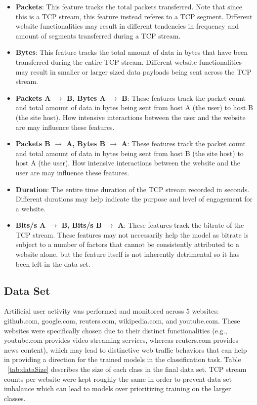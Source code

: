 \documentclass[10pt,sigconf,letterpaper,nonacm]{acmart}
\begin{document}
\begin{itemize}
  \item \textbf{Packets}: This feature tracks the total packets transferred. Note that since this is a TCP stream, this feature instead referes to a TCP segment. Different website functionalities may result in different tendencies in frequency and amount of segments transferred during a TCP stream.
  
  \item \textbf{Bytes}: This feature tracks the total amount of data in bytes that have been transferred during the entire TCP stream. Different website functionalities may result in smaller or larger sized data payloads being sent across the TCP stream.
  
  \item \textbf{Packets A $\rightarrow$ B, Bytes A $\rightarrow$ B}: These features track the packet count and total amount of data in bytes being sent from host A (the user) to host B (the site host). How intensive interactions between the user and the website are may influence these features.
  
  \item \textbf{Packets B $\rightarrow$ A, Bytes B $\rightarrow$ A}: These features track the packet count and total amount of data in bytes being sent from host B (the site host) to host A (the user). How intensive interactions between the website and the user are may influence these features.
  
  \item \textbf{Duration}: The entire time duration of the TCP stream recorded in seconds. Different durations may help indicate the purpose and level of engagement for a website.
  
  \item \textbf{Bits/s A $\rightarrow$ B, Bits/s B $\rightarrow$ A}: These features track the bitrate of the TCP stream. These features may not necessarily help the model as bitrate is subject to a number of factors that cannot be consistently attributed to a website alone, but the feature itself is not inherently detrimental so it has been left in the data set.
\end{itemize}

\subsection{Data Set}

Artificial user activity was performed and monitored across 5 websites: github.com, google.com, reuters.com, wikipedia.com, and youtube.com.
These websites were specifically chosen due to their distinct functionalities (e.g., youtube.com provides video streaming services, whereas reuters.com provides news content), which may lead to distinctive web traffic behaviors that can help in providing a direction for the trained models in the classification task.
Table ~\ref{tab:dataSize} describes the size of each class in the final data set.
TCP stream counts per website were kept roughly the same in order to prevent data set imbalance which can lead to models over prioritizing training on the larger classes.
\end{document}
